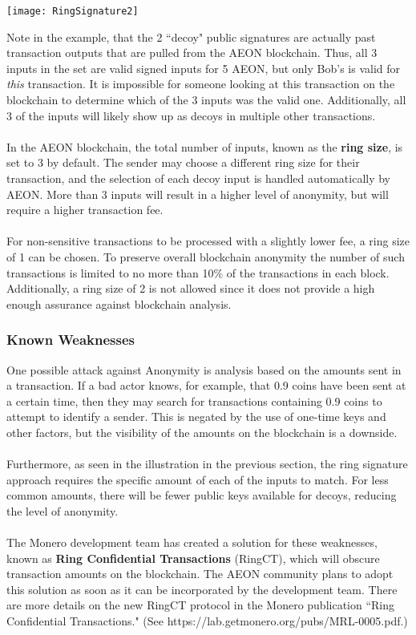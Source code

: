 \begin{center}
	\texttt{[image: RingSignature2]}
\end{center}
Note in the example, that the 2 “decoy" public signatures are actually past transaction outputs that are pulled from the AEON blockchain. Thus, all 3 inputs in the set are valid signed inputs for 5 AEON, but only Bob's is valid for \textit{this} transaction.  It is impossible for someone looking at this transaction on the blockchain to determine which of the 3 inputs was the valid one.  Additionally, all 3 of the inputs will likely show up as decoys in multiple other transactions.\\
\\
In the AEON blockchain, the total number of inputs, known as the \textbf{ring size}, is set to 3 by default. The sender may choose a different ring size for their transaction, and the selection of each decoy input is handled automatically by AEON. More than 3 inputs will result in a higher level of anonymity, but will require a higher transaction fee.\\
\\
For non-sensitive transactions to be processed with a slightly lower fee, a ring size of 1 can be chosen.  To preserve overall blockchain anonymity the number of such transactions is limited to no more than 10\% of the transactions in each block.  Additionally, a ring size of 2 is not allowed since it does not provide a high enough assurance against blockchain analysis.

\subsubsection{Known Weaknesses}
One possible attack against Anonymity is analysis based on the amounts sent in a transaction. If a bad actor knows, for example, that 0.9 coins have been sent at a certain time, then they may search for transactions containing 0.9 coins to attempt to identify a sender.  This is negated by the use of one-time keys and other factors, but the visibility of the amounts on the blockchain is a downside.\\
\\
Furthermore, as seen in the illustration in the previous section, the ring signature approach requires the specific amount of each of the inputs to match.  For less common amounts, there will be fewer public keys available for decoys, reducing the level of anonymity.\\
\\
The Monero development team has created a solution for these weaknesses, known as \textbf{Ring Confidential Transactions} (RingCT), which will obscure transaction amounts on the blockchain.  The AEON community plans to adopt this solution as soon as it can be incorporated by the development team.  There are more details on the new RingCT protocol in the Monero publication “Ring Confidential Transactions." (See https://lab.getmonero.org/pubs/MRL-0005.pdf.)

